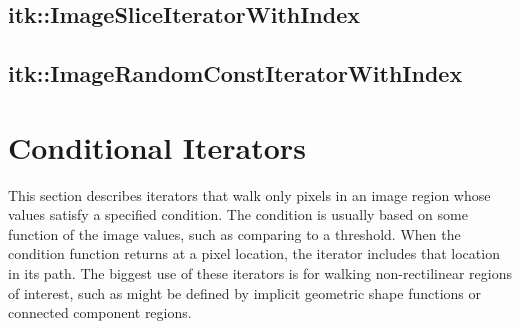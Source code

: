 \subsection{itk::ImageSliceIteratorWithIndex}
\label{sec:itkImageSliceIteratorWithIndex}


\subsection{itk::ImageRandomConstIteratorWithIndex}
\label{sec:itkImageRandomConstIteratorWithIndex}


\section{Conditional Iterators}
\label{sec:ConditionalIterators}
This section describes iterators that walk only pixels in an image region whose
values satisfy a specified condition.  The condition is usually based on some
function of the image values, such as comparing to a threshold.  When the
condition function returns  at a pixel location, the iterator
includes that location in its path.  The biggest use of these iterators is for
walking non-rectilinear regions of interest, such as might be defined by
implicit geometric shape functions or connected component regions.


%

